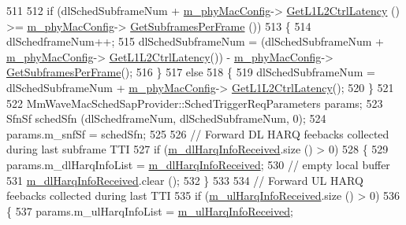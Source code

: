 \begin{DoxyCode}
511 
512                 \textcolor{keywordflow}{if} (dlSchedSubframeNum + \hyperlink{classns3_1_1MmWaveEnbMac_a358d0c9a4ae2249b604143e654e7d45e}{m\_phyMacConfig}->
      \hyperlink{classns3_1_1MmWavePhyMacCommon_a15d8a9077e0cc01988071eb3abe1f3de}{GetL1L2CtrlLatency} () >= \hyperlink{classns3_1_1MmWaveEnbMac_a358d0c9a4ae2249b604143e654e7d45e}{m\_phyMacConfig}->
      \hyperlink{classns3_1_1MmWavePhyMacCommon_a3709cf52f6813eb8ad1af16d95082dc1}{GetSubframesPerFrame} ())
513                 \{
514                   dlSchedframeNum++;
515                   dlSchedSubframeNum = (dlSchedSubframeNum + \hyperlink{classns3_1_1MmWaveEnbMac_a358d0c9a4ae2249b604143e654e7d45e}{m\_phyMacConfig}->
      \hyperlink{classns3_1_1MmWavePhyMacCommon_a15d8a9077e0cc01988071eb3abe1f3de}{GetL1L2CtrlLatency}()) - \hyperlink{classns3_1_1MmWaveEnbMac_a358d0c9a4ae2249b604143e654e7d45e}{m\_phyMacConfig}->
      \hyperlink{classns3_1_1MmWavePhyMacCommon_a3709cf52f6813eb8ad1af16d95082dc1}{GetSubframesPerFrame}();
516                 \}
517                 \textcolor{keywordflow}{else}
518                 \{
519                   dlSchedSubframeNum = dlSchedSubframeNum + \hyperlink{classns3_1_1MmWaveEnbMac_a358d0c9a4ae2249b604143e654e7d45e}{m\_phyMacConfig}->
      \hyperlink{classns3_1_1MmWavePhyMacCommon_a15d8a9077e0cc01988071eb3abe1f3de}{GetL1L2CtrlLatency}();
520                 \}
521 
522                 MmWaveMacSchedSapProvider::SchedTriggerReqParameters params;
523                 SfnSf schedSfn (dlSchedframeNum, dlSchedSubframeNum, 0);
524                 params.m\_snfSf = schedSfn;
525 
526                 \textcolor{comment}{// Forward DL HARQ feebacks collected during last subframe TTI}
527                 \textcolor{keywordflow}{if} (\hyperlink{classns3_1_1MmWaveEnbMac_accfe25fdd9a18c09dd39a062e02370e5}{m\_dlHarqInfoReceived}.size () > 0)
528                 \{
529                         params.m\_dlHarqInfoList = \hyperlink{classns3_1_1MmWaveEnbMac_accfe25fdd9a18c09dd39a062e02370e5}{m\_dlHarqInfoReceived};
530                         \textcolor{comment}{// empty local buffer}
531                         \hyperlink{classns3_1_1MmWaveEnbMac_accfe25fdd9a18c09dd39a062e02370e5}{m\_dlHarqInfoReceived}.clear ();
532                 \}
533 
534                 \textcolor{comment}{// Forward UL HARQ feebacks collected during last TTI}
535                 \textcolor{keywordflow}{if} (\hyperlink{classns3_1_1MmWaveEnbMac_a6beff4b0a92540e9be34e5d2fa2c7842}{m\_ulHarqInfoReceived}.size () > 0)
536                 \{
537                         params.m\_ulHarqInfoList = \hyperlink{classns3_1_1MmWaveEnbMac_a6beff4b0a92540e9be34e5d2fa2c7842}{m\_ulHarqInfoReceived};

\end{DoxyCode}
